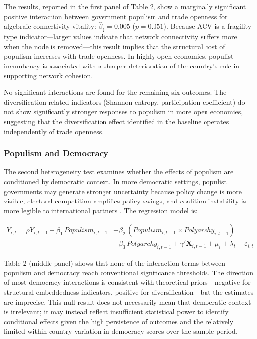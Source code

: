 \documentclass[12pt]{article}
\begin{document}
The results, reported in the first panel of Table 2, show a marginally significant positive interaction between government populism and trade openness for algebraic connectivity vitality: $\hat{\beta}_2 = 0.005$ ($p = 0.051$). Because ACV is a fragility-type indicator---larger values indicate that network connectivity suffers more when the node is removed---this result implies that the structural cost of populism increases with trade openness. In highly open economies, populist incumbency is associated with a sharper deterioration of the country's role in supporting network cohesion.

No significant interactions are found for the remaining six outcomes. The diversification-related indicators (Shannon entropy, participation coefficient) do not show significantly stronger responses to populism in more open economies, suggesting that the diversification effect identified in the baseline operates independently of trade openness.

\subsubsection*{Populism and Democracy}

The second heterogeneity test examines whether the effects of populism are conditioned by democratic context. In more democratic settings, populist governments may generate stronger uncertainty because policy change is more visible, electoral competition amplifies policy swings, and coalition instability is more legible to international partners \citep{bermeo2016, norrisinglehart2019}. The regression model is:

\begin{equation}
\label{eq:democracy}
\begin{split}
Y_{i,t} = \rho Y_{i,t-1} + \beta_1 \, Populism_{i,t-1}
  &+ \beta_2 \, (Populism_{i,t-1} \times Polyarchy_{i,t-1}) \\
  &+ \beta_3 \, Polyarchy_{i,t-1} + \gamma' \mathbf{X}_{i,t-1} + \mu_i + \lambda_t + \varepsilon_{i,t}
\end{split}
\end{equation}

Table 2 (middle panel) shows that none of the interaction terms between populism and democracy reach conventional significance thresholds. The direction of most democracy interactions is consistent with theoretical priors---negative for structural embeddedness indicators, positive for diversification---but the estimates are imprecise. This null result does not necessarily mean that democratic context is irrelevant; it may instead reflect insufficient statistical power to identify conditional effects given the high persistence of outcomes and the relatively limited within-country variation in democracy scores over the sample period.
\end{document}
